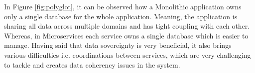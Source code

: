    In Figure \ref{fig:polyglot}, it can be observed how a Monolithic application owns only a single database for the whole application. Meaning,
   the application is sharing all data across multiple domains and has tight coupling with each other. Whereas, in Microservices each service owns
   a single database which is easier to manage. Having said that data sovereignty is very beneficial, it also brings various difficulties
   i.e. coordinations between services, which are very challenging to tackle and creates data coherency issues in the system. 




